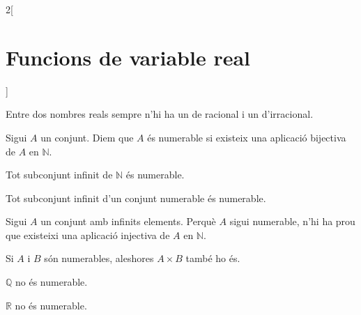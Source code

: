 \documentclass[../../../main.tex]{subfiles}
\begin{document}
\begin{multicols}{2}[\section{Funcions de variable real}]
\begin{prop}
Entre dos nombres reals sempre n'hi ha un de racional i un d'irracional.
\end{prop}
\begin{definition}
Sigui $A$ un conjunt. Diem que $A$ és numerable si existeix una aplicació bijectiva de $A$ en $\mathbb{N}$.
\end{definition}
\begin{prop}
Tot subconjunt infinit de $\mathbb{N}$ és numerable.
\end{prop}
\begin{corollary}
Tot subconjunt infinit d’un conjunt numerable és numerable.
\end{corollary}
\begin{corollary}
Sigui $A$ un conjunt amb infinits elements. Perquè $A$ sigui numerable,
n'hi ha prou que existeixi una aplicació injectiva de $A$ en $\mathbb{N}$.
\end{corollary}
\begin{prop}
Si $A$ i $B$ són numerables, aleshores $A\times B$ també ho és.
\end{prop}
\begin{theorem}
$\mathbb{Q}$ no és numerable.
\end{theorem}
\begin{theorem}
$\mathbb{R}$ no és numerable.
\end{theorem}

\end{multicols}
\end{document}
